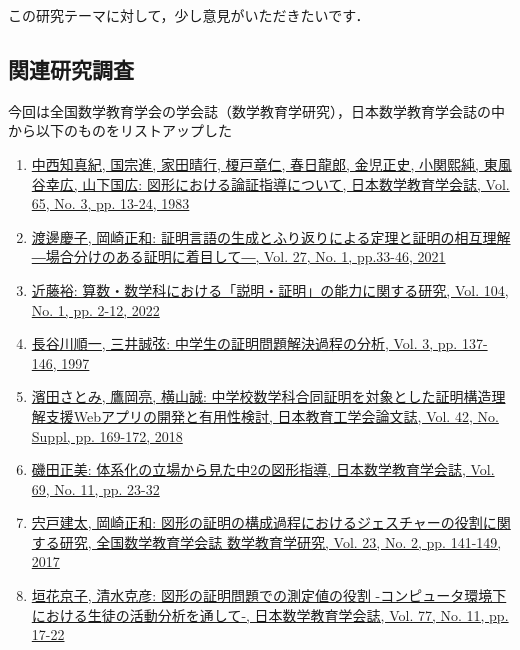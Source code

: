 \documentclass[a4paper,12pt]{ltjsarticle}
\begin{document}
この研究テーマに対して，少し意見がいただきたいです．\\

\subsection{関連研究調査}
今回は全国数学教育学会の学会誌（数学教育学研究），日本数学教育学会誌の中から以下のものをリストアップした

\begin{enumerate}
  \item \href{https://www.jstage.jst.go.jp/article/jjsme/65/3/65_13/_pdf/-char/ja}{中西知真紀, 国宗進, 家田晴行, 榎戸章仁, 春日龍郎, 金児正史, 小関熙純, 東風谷幸広, 山下国広: 図形における論証指導について, 日本数学教育学会誌, Vol. 65, No. 3, pp. 13-24, 1983}
  \item \href{https://www.jstage.jst.go.jp/article/jasme/27/1/27_33/_pdf/-char/ja}{渡邊慶子, 岡崎正和: 証明言語の生成とふり返りによる定理と証明の相互理解 ―場合分けのある証明に着目して―, Vol. 27, No. 1, pp.33-46, 2021}
  \item \href{https://www.jstage.jst.go.jp/article/jjsme/104/1/104_2/_pdf/-char/ja}{近藤裕: 算数・数学科における「説明・証明」の能力に関する研究, Vol. 104, No. 1, pp. 2-12, 2022}
  \item \href{https://www.jstage.jst.go.jp/article/jasme/3/0/3_KJ00008199223/_pdf/-char/ja}{長谷川順一, 三井誠弦: 中学生の証明問題解決過程の分析, Vol. 3, pp. 137-146, 1997}
  \item \href{https://www.jstage.jst.go.jp/article/jjet/42/Suppl./42_S42092/_pdf/-char/ja}{濱田さとみ, 鷹岡亮, 横山誠: 中学校数学科合同証明を対象とした証明構造理解支援Webアプリの開発と有用性検討, 日本教育工学会論文誌, Vol. 42, No. Suppl, pp. 169-172, 2018}
  \item \href{https://www.jstage.jst.go.jp/article/jjsme/69/11/69_23/_pdf/-char/en}{磯田正美: 体系化の立場から見た中2の図形指導, 日本数学教育学会誌, Vol. 69, No. 11, pp. 23-32}
  \item \href{https://www.jstage.jst.go.jp/article/jasme/23/2/23_141/_pdf/-char/ja}{宍戸建太, 岡崎正和: 図形の証明の構成過程におけるジェスチャーの役割に関する研究, 全国数学教育学会誌 数学教育学研究, Vol. 23, No. 2, pp. 141-149, 2017}
  \item \href{https://www.jstage.jst.go.jp/article/jjsme/77/11/77_17/_pdf/-char/ja}{垣花京子, 清水克彦: 図形の証明問題での測定値の役割 -コンピュータ環境下における生徒の活動分析を通して-, 日本数学教育学会誌, Vol. 77, No. 11, pp. 17-22}
\end{enumerate}
\newpage
\end{document}
